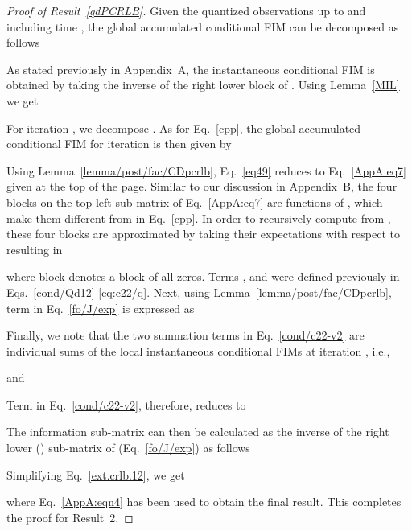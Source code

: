 \documentclass[10pt,twocolumn,twoside]{IEEEtran}
\begin{document}
\begin{proof}[Proof of Result~\ref{qdPCRLB}]
Given the quantized observations up to and including time , the global accumulated conditional FIM  can be decomposed as follows

As stated previously in Appendix~A, the  instantaneous conditional FIM  is obtained by taking the inverse of the right lower block of . Using Lemma~\ref{MIL} we get

For iteration , we
decompose .
As for Eq.~\eqref{cpp},
 the global accumulated conditional FIM for iteration  is
then given by

Using Lemma~\ref{lemma/post/fac/CDpcrlb}, Eq.~\eqref{eq49} reduces to Eq.~\eqref{AppA:eq7} given at the top of the page.
Similar to our discussion in Appendix~B,
the four blocks on the top left sub-matrix of Eq.~\eqref{AppA:eq7} are functions of , which make them different from  in Eq.~\eqref{cpp}.  In order to recursively compute   from , these four blocks are approximated by taking their expectations with respect to  resulting in
\setcounter{equation}{53}

where block  denotes a block of all zeros.
Terms ,  and  were defined previously
 in Eqs.~\eqref{cond/Qd12}-\eqref{eq:c22/q}.
Next, using Lemma~\ref{lemma/post/fac/CDpcrlb}, term  in Eq.~\eqref{fo/J/exp} is expressed as

Finally,  we note that the two summation terms in Eq.~\eqref{cond/c22-v2} are  individual sums of the local instantaneous conditional FIMs at iteration , i.e.,

and

Term  in Eq.~\eqref{cond/c22-v2}, therefore, reduces to

The information sub-matrix 
can then be calculated as the inverse of the right lower ()
sub-matrix of   (Eq.~\eqref{fo/J/exp}) as follows

Simplifying Eq.~\eqref{ext.crlb.12}, we get

where Eq.~\eqref{AppA:eqn4} has been used to obtain the final result.
This completes the proof for Result~2.
\end{proof}
\end{document}
